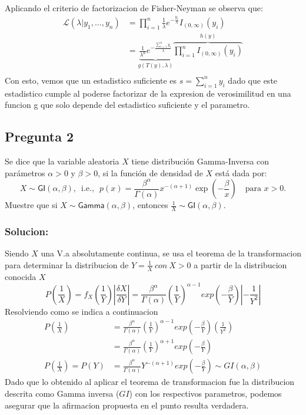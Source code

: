 \documentclass[
]{article}
\begin{document}
Aplicando el criterio de factorizacion de Fisher-Neyman se observa que:
\[
\begin{split}
\mathcal{L}(\lambda|y_1,...,y_n)&=\prod_{i=1}^{n}\frac{1}{\lambda}e^{-\frac{y_i}{\lambda}}I_{(0,\infty)}(y_i)\\
&=\underbrace{\frac{1}{\lambda^n}e^{-\frac{\sum_{i=1}^ny_i}{\lambda}}}_{g(T(y),\lambda)}\overbrace{\prod_{i=1}^{n}I_{(0,\infty)}(y_i)}^{h(y)} \\
\end{split}
\] Con esto, vemos que un estadistico suficiente es
\(s=\sum_{i=1}^ny_i\) dado que este estadistico cumple al poderse
factorizar de la expresion de verosimilitud en una funcion g que solo
depende del estadistico suficiente y el parametro.

\hypertarget{pregunta-2}{%
\subsection*{Pregunta 2}\label{pregunta-2}}

Se dice que la variable aleatoria \(X\) tiene distribución Gamma-Inversa
con parámetros \(\alpha>0\) y \(\beta>0\), si la función de densidad de
\(X\) está dada por: \[
    X \sim \textsf{GI} ( \alpha, \beta )\text{,} \ \ \ \textrm{i.e.,} \ \ \ 
    p ( x ) = \frac{ \beta^\alpha }{ \Gamma ( \alpha ) } x^{ - ( \alpha + 1 ) } \exp{ \left( - \frac{ \beta }{ x } \right) } \quad\text{para $x>0$}.
    \] Muestre que si \(X\sim\textsf{Gamma}(\alpha,\beta)\), entonces
\(\frac{1}{X}\sim \textsf{GI} ( \alpha, \beta )\).

\hypertarget{solucion-1}{%
\subsubsection*{Solucion:}\label{solucion-1}}

Siendo \(X\) una V.a absolutamente continua, se usa el teorema de la
transformacion para determinar la distribucion de
\(Y=\frac{1}{X} \ con \ X>0\) a partir de la distribucion conocida \(X\)
\[
P\left( \frac{1}{X}\right) =f_X\left( \frac{1}{Y}\right) \left| \frac{\delta X}{\delta Y} \right|= \frac{\beta^{\alpha}}{\Gamma(\alpha)}\left(\frac{1}{Y} \right)^{\alpha -1}exp\left( -\frac{\beta}{Y} \right) \left| -\frac{1}{Y^2} \right|
\] Resolviendo como se indica a continuacion \[
\begin{split}
P\left( \frac{1}{X}\right) &=\frac{\beta^{\alpha}}{\Gamma(\alpha)}\left(\frac{1}{Y} \right)^{\alpha -1}exp\left( -\frac{\beta}{Y} \right) \left( \frac{1}{Y^2} \right)\\
&=\frac{\beta^{\alpha}}{\Gamma(\alpha)}\left(\frac{1}{Y} \right)^{\alpha +1}exp\left( -\frac{\beta}{Y} \right) \\
P\left( \frac{1}{X}\right)=P\left( Y \right)&=\frac{\beta^{\alpha}}{\Gamma(\alpha)}Y^{-(\alpha +1)}exp\left( -\frac{\beta}{Y} \right) \sim GI(\alpha,\beta)
\end{split}
\] Dado que lo obtenido al aplicar el teorema de transformacion fue la
distribucion descrita como Gamma inversa (\(GI\)) con los respectivos
parametros, podemos asegurar que la afirmacion propuesta en el punto
resulta verdadera.
\end{document}
